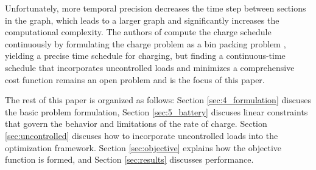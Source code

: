 \par Unfortunately, more temporal precision decreases the time step between sections in the graph, which leads to a larger graph and significantly increases the computational complexity. The authors of \cite{brown_position_nodate} compute the charge schedule continuously by formulating the charge problem as a bin packing problem \cite{Ma_Mixed-integer_2017}, yielding a precise time schedule for charging, but finding a continuous-time schedule that incorporates uncontrolled loads and minimizes a comprehensive cost function remains an open problem and is the focus of this paper. 
\par The rest of this paper is organized as follows: Section \ref{sec:4_formulation} discuses the basic problem formulation, Section \ref{sec:5_battery} discuses linear constraints that govern the behavior and limitations of the rate of charge. Section \ref{sec:uncontrolled} discuses how to incorporate uncontrolled loads into the optimization framework. Section \ref{sec:objective} explains how the objective function is formed, and Section \ref{sec:results} discusses performance.
